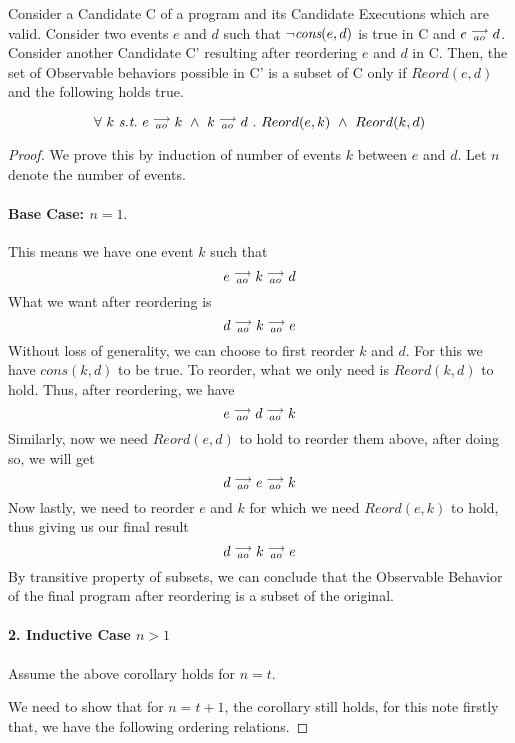 \begin{corollary}
    Consider a Candidate C of a program and its Candidate Executions which are valid. Consider two events $e$ and $d$ such that $\neg \textit{cons}(e,d)$ is true in C and $e\stackrel{\longrightarrow}{_{ao}}d$. 
    Consider another Candidate C' resulting after reordering $e$ and $d$ in C. 
    Then, the set of Observable behaviors possible in C' is a subset of C only if $Reord(e,d)$ and the following holds true.
    
    \[
        \forall \ k \ \textit{s.t.} \ 
        \reln{e}{ao}{k} \ \wedge \ \reln{k}{ao}{d} \ . \ 
        Reord(e,k) \ \wedge \ Reord(k,d)
    \]
    
    \label{corol1}
\end{corollary}
    
\begin{proof}
    We prove this by induction of number of events $k$ between $e$ and $d$. Let $n$ denote the number of events.

    \paragraph{Base Case: $n = 1.$}
        This means we have one event $k$ such that
            \[
                e\stackrel{\longrightarrow}{_{ao}}k\stackrel{\longrightarrow}{_{ao}}d 
            \]
        What we want after reordering is 
        \[
            d\stackrel{\longrightarrow}{_{ao}}k\stackrel{\longrightarrow}{_{ao}}e 
        \]
        Without loss of generality, we can choose to first reorder $k$ and $d$. For this we have $cons(k,d)$ to be true. To reorder, what we only need is $Reord(k,d)$ to hold. Thus, after reordering, we have
        \[
            e\stackrel{\longrightarrow}{_{ao}}d\stackrel{\longrightarrow}{_{ao}}k 
        \]
        Similarly, now we need $Reord(e,d)$ to hold to reorder them above, after doing so, we will get
        \[
            d\stackrel{\longrightarrow}{_{ao}}e\stackrel{\longrightarrow}{_{ao}}k 
        \]
        Now lastly, we need to reorder $e$ and $k$ for which we need $Reord(e,k)$ to hold, thus giving us our final result
        \[
            d\stackrel{\longrightarrow}{_{ao}}k\stackrel{\longrightarrow}{_{ao}}e 
        \]
        By transitive property of subsets, we can conclude that the Observable Behavior of the final program after reordering is a subset of the original.  

    \paragraph{2. Inductive Case $n > 1$}
        Assume the above corollary holds for $n = t$. 
        
        We need to show that for $n = t + 1$, the corollary still holds, for this note firstly that, we have the following ordering relations. 
        

\end{proof}
